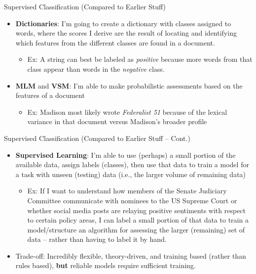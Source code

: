 \documentclass[
  ignorenonframetext,
  aspectratio=169]{beamer}
\begin{document}
\begin{frame}{Supervised Classification (Compared to Earlier Stuff)}
\label{supervised-classification-compared-to-earlier-stuff}
\begin{itemize}
\item \textbf{Dictionaries}: I'm going to create a dictionary with classes assigned to words, where the scores I derive are the result of locating and identifying which features from the different classes are found in a document. 
  \begin{itemize}
  \item[]Ex: A string can best be labeled as \textit{positive} because more words from that class appear than words in the \textit{negative} class. 
  \end{itemize} \par \vspace{2.5mm} \pause
\item \textbf{MLM} and \textbf{VSM}: I'm able to make probabilistic assessments based on the features of a document
  \begin{itemize}
  \item[]Ex: Madison most likely wrote \textit{Federalist 51} because of the lexical variance in that document versus Madison's broader profile
  \end{itemize}  \par \vspace{2.5mm} 
\end{itemize}
\end{frame}

\begin{frame}{Supervised Classification (Compared to Earlier Stuff --
Cont.)}
\label{supervised-classification-compared-to-earlier-stuff-cont.}
\begin{itemize}
\item \textbf{Supervised Learning}: I'm able to use (perhaps) a small portion of the available data, assign labels (classes), then use that data to train a model for a task with unseen (testing) data (i.e., the larger volume of remaining data)
\begin{itemize}
  \item[]Ex: If I want to understand how members of the Senate Judiciary Committee communicate with nominees to the US Supreme Court or whether social media posts are relaying positive sentiments with respect to certain policy areas, I can label a small portion of that data to train a model/structure an algorithm for assessing the larger (remaining) set of data -- rather than having to label it by hand.  
  \end{itemize} \par \vspace{2.5mm} \pause
\item Trade-off: Incredibly flexible, theory-driven, and training based (rather than rules based), \textbf{but} reliable models require sufficient training. 
\end{itemize}
\end{frame}
\end{document}
